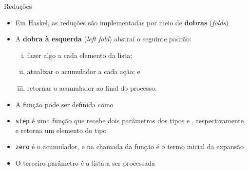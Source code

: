\begin{frame}[fragile]{Reduções}

    \begin{itemize}
        \item Em Haskel, as reduções são implementadas por meio de \textbf{dobras} (\textit{folds})

        \item A \textbf{dobra à esquerda} (\textit{left fold}) abstraí o seguinte padrão:
        \begin{enumerate}[i.]
            \item fazer algo a cada elemento da lista;
            \item atualizar o acumulador a cada ação; e
            \item retornar o acumulador ao final do processo.
        \end{enumerate}

        \item A função  pode ser definida como


        \item \texttt{step} é uma função que recebe dois parâmetros dos tipos 
             e , respectivamente, e retorna um elemento do
            tipo 

        \item \texttt{zero} é o acumulador, e na chamada da função 
            é o termo inicial da expansão

        \item O terceiro parâmetro é a lista a ser processada
    \end{itemize}

\end{frame}

